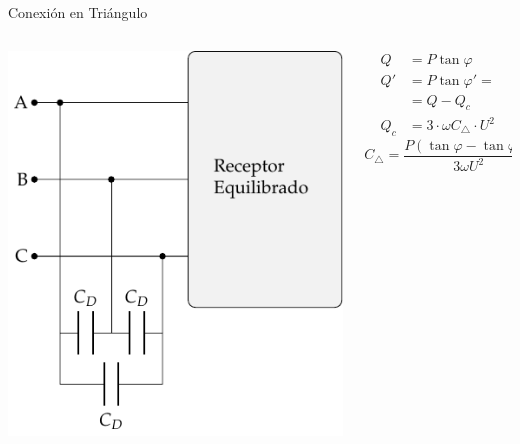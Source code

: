 \documentclass[aspectratio=169, usenames,svgnames,dvipsnames]{beamer}
\begin{document}
\begin{frame}[label={sec:orgbbf5e6d}]{Conexión en Triángulo}
\begin{columns}
\begin{column}{0.5\columnwidth}
\begin{center}
\includegraphics[width=.9\linewidth]{../figs/CircuitoTrifasica_CompensacionReactiva.pdf}
\end{center}
\end{column}

\begin{column}{0.5\columnwidth}
\begin{align*}
  Q &= P\tan\varphi\\
  Q' &= P\tan\varphi' =\\
    &= Q - Q_c\\
  Q_c &= 3 \cdot \omega C_\triangle \cdot U^2
\end{align*}
\[
  \boxed{C_\triangle = \frac{P(\tan \varphi - \tan \varphi')}{3\omega U^2}}
\]
\end{column}
\end{columns}
\end{frame}
\end{document}
